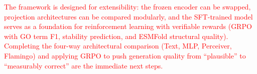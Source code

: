 \documentclass[11pt]{article}
\begin{document}
\textcolor{red}{The framework is designed for extensibility: the frozen encoder can be swapped, projection architectures can be compared modularly, and the SFT-trained model serves as a foundation for reinforcement learning with verifiable rewards (GRPO with GO term F1, stability prediction, and ESMFold structural quality). Completing the four-way architectural comparison (Text, MLP, Perceiver, Flamingo) and applying GRPO to push generation quality from ``plausible'' to ``measurably correct'' are the immediate next steps.}



\end{document}
